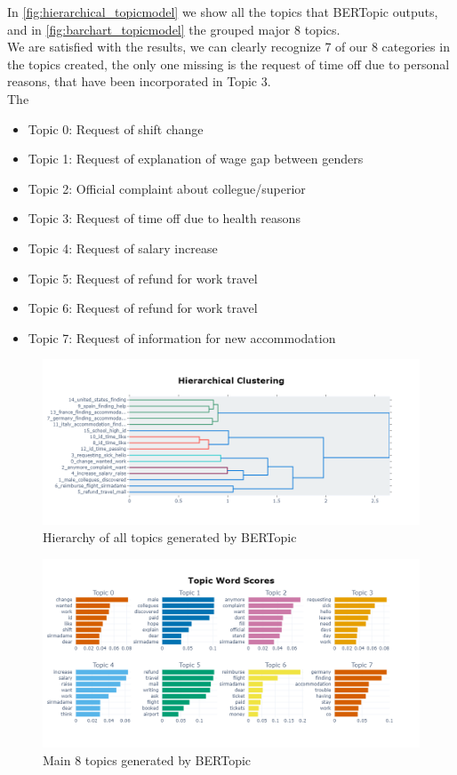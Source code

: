 In \autoref{fig:hierarchical_topicmodel} we show all the topics that BERTopic outputs, and in \autoref{fig:barchart_topicmodel} the grouped major 8 topics. \\
We are satisfied with the results, we can clearly recognize 7 of our 8 categories in the topics created, the only one missing is the request of time off due to personal reasons, that have been incorporated in Topic 3. \\
The 
\begin{itemize}
    \item Topic 0: Request of shift change
    \item Topic 1: Request of explanation of wage gap between genders
    \item Topic 2: Official complaint about collegue/superior
    \item Topic 3: Request of time off due to health reasons
    \item Topic 4: Request of salary increase
    \item Topic 5: Request of refund for work travel
    \item Topic 6: Request of refund for work travel
    \item Topic 7: Request of information for new accommodation
\end{itemize}


\begin{figure}[h] 
    \includegraphics[width=\textwidth]{images/hierarchy_topic_model.png}
    \caption{Hierarchy of all topics generated by BERTopic}
    \label{fig:hierarchical_topicmodel}
\end{figure}


\begin{figure}[h] 
    \includegraphics[width=\textwidth]{images/barchart_topicmodel.png}
    \caption{Main 8 topics generated by BERTopic}
    \label{fig:barchart_topicmodel}
\end{figure}    
